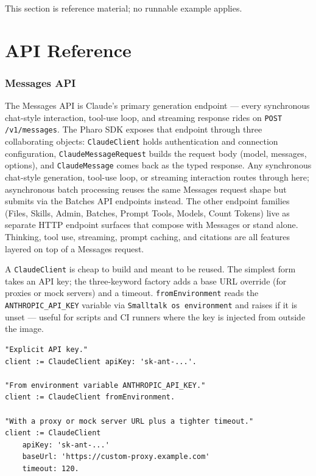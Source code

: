 \documentclass[a4paper,10pt,fleqn]{article}
\begin{document}
This section is reference material; no runnable example applies.

\medskip
{}

\part{API Reference}

\section{Messages API}
\label{sec:messages}

The Messages API is Claude's primary generation endpoint --- every
synchronous chat-style interaction, tool-use loop, and streaming
response rides on \texttt{POST /v1/messages}.  The Pharo SDK
exposes that endpoint through three collaborating objects:
\texttt{ClaudeClient} holds authentication and connection
configuration, \texttt{ClaudeMessageRequest} builds the request
body (model, messages, options), and \texttt{ClaudeMessage}
comes back as the typed response.  Any synchronous chat-style
generation, tool-use loop, or streaming interaction routes through
here; asynchronous batch processing reuses the same Messages request
shape but submits via the Batches API endpoints instead.  The other
endpoint families (Files, Skills, Admin, Batches, Prompt Tools,
Models, Count Tokens) live as separate HTTP endpoint surfaces that
compose with Messages or stand alone.  Thinking, tool use,
streaming, prompt caching, and citations are all features
layered on top of a Messages request.

A \texttt{ClaudeClient} is cheap to build and meant to be reused.
The simplest form takes an API key; the three-keyword factory
adds a base URL override (for proxies or mock servers) and a
timeout.  \texttt{fromEnvironment} reads the
\texttt{ANTHROPIC\_API\_KEY} variable via \texttt{Smalltalk os
environment} and raises if it is unset --- useful for scripts
and CI runners where the key is injected from outside the image.

\begin{lstlisting}[language={}]
"Explicit API key."
client := ClaudeClient apiKey: 'sk-ant-...'.

"From environment variable ANTHROPIC_API_KEY."
client := ClaudeClient fromEnvironment.

"With a proxy or mock server URL plus a tighter timeout."
client := ClaudeClient
    apiKey: 'sk-ant-...'
    baseUrl: 'https://custom-proxy.example.com'
    timeout: 120.
\end{lstlisting}
\end{document}
